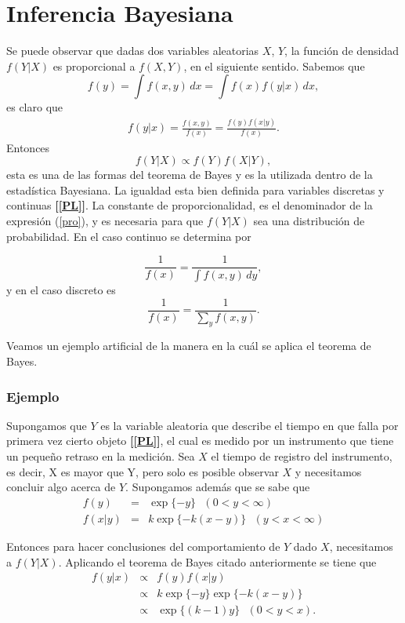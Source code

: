 \section{Inferencia Bayesiana}

\noindent Se puede observar que dadas dos variables aleatorias $X$, $Y$, la funci\'on de densidad $f(Y|X)$ es proporcional a $f(X,Y)$, en el siguiente sentido. Sabemos que
 $$f(y)=\int f(x,y)\,dx=\int f(x)f(y|x)\,dx,$$
 es claro que 
\begin{eqnarray}
f(y|x)=\frac{f(x,y)}{f(x)}=\frac{f(y)f(x|y)}{f(x)}.\label{pro}
\end{eqnarray}
Entonces $$f(Y|X)\propto f(Y)f(X|Y),$$
esta es una de las formas del teorema de Bayes y es la utilizada dentro de la estad\'istica Bayesiana. La igualdad esta bien definida para variables discretas y continuas  {\bf  [\ref{PL}]}. La constante
 de proporcionalidad, es el denominador de la expresi\'on (\ref{pro}), y es necesaria para que $f(Y|X)$ sea una distribuci\'on de probabilidad. En el caso continuo se determina por

$$\frac{1}{f(x)}=\frac{1}{\int f(x,y)\,dy},$$y en el caso discreto es 
$$\frac{1}{f(x)}=\frac{1}{\sum_{y} f(x,y)}.$$



\noindent Veamos un ejemplo artificial de la manera en la cu\'al se aplica el teorema de Bayes.

\subsubsection{Ejemplo}
\noindent Supongamos que $Y$ es la variable aleatoria que describe el tiempo en que falla por primera vez cierto objeto {\bf  [\ref{PL}]}, el cual es medido por un instrumento que tiene un peque\~no retraso en  la medici\'on. Sea $X$ el tiempo de registro del instrumento, es decir, X es mayor que Y, pero solo es posible observar $X$ y necesitamos concluir algo acerca de $Y$. Supongamos adem\'as que se sabe que
\begin{eqnarray*}
f(y)&=&\exp\{-y\} \mbox{  } (0<y<\infty)\\
f(x|y)&=&k\exp\{-k(x-y)\}  \mbox{  } (y<x<\infty)
\end{eqnarray*}

\noindent Entonces para hacer conclusiones del comportamiento de $Y$ dado $X$, necesitamos a  $f(Y|X)$. Aplicando el teorema de Bayes citado anteriormente se tiene que
\begin{eqnarray*}
f(y|x) &\propto& f(y)f(x|y)\\
&\propto& k\exp\{-y\}\exp\{-k(x-y)\} \\
&\propto& \exp\{(k-1)y\}  \mbox{  } (0<y<x).
\end{eqnarray*}

